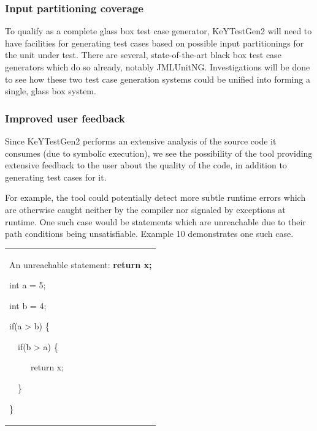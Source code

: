 \documentclass{article}
\newcommand{\tmstrong}[1]{\textbf{#1}}
\newenvironment{tmindent}{\begin{tmparmod}{1.5em}{0pt}{0pt} }{\end{tmparmod}}
\newenvironment{tmparmod}[3]{\begin{list}{}{\setlength{\topsep}{0pt}\setlength{\leftmargin}{#1}\setlength{\rightmargin}{#2}\setlength{\parindent}{#3}\setlength{\listparindent}{\parindent}\setlength{\itemindent}{\parindent}\setlength{\parsep}{\parskip}} \item[]}{\end{list}}
\newenvironment{tmparsep}[1]{\begingroup\setlength{\parskip}{#1}}{\endgroup}
\begin{document}
\subsubsection{Input partitioning coverage}

To qualify as a complete glass box test case generator, KeYTestGen2 will need
to have facilities for generating test cases based on possible input
partitionings for the unit under test. There are several, state-of-the-art
black box test case generators which do so already, notably JMLUnitNG.
Investigations will be done to see how these two test case generation systems
could be unified into forming a single, glass box system.

\subsubsection{Improved user feedback}

Since KeYTestGen2 performs an extensive analysis of the source code it
consumes (due to symbolic execution), we see the possibility of the tool
providing extensive feedback to the user about the quality of the code, in
addition to generating test cases for it.



For example, the tool could potentially detect more subtle runtime errors
which are otherwise caught neither by the compiler nor signaled by exceptions
at runtime. One such case would be statements which are unreachable due to
their path conditions being unsatisfiable. Example 10 demonstrates one such
case.



\begin{tmparmod}{1cm}{0pt}{0pt}
  \begin{tmparmod}{0pt}{1cm}{0pt}
    {\noindent}{\noindent}\begin{tabular}{l}
      \begin{example}
        
        
        
        
        An unreachable statement: {\tmstrong{return x;}}
        
        {\noindent}\begin{tmindent}
          \begin{tmparsep}{0em}
            int a = 5;
            
            int b = 4;
            
            if(a > b) \{
            
            \ \ if(b > a) \{
            
            \ \ \ \ \ return x;
            
            \ \ \}
            
            \}
          \end{tmparsep}
        \end{tmindent}{\hspace*{\fill}}{\medskip}
      \end{example}
    \end{tabular}{\hspace*{\fill}}{\smallskip}
  \end{tmparmod}
\end{tmparmod}
\end{document}

